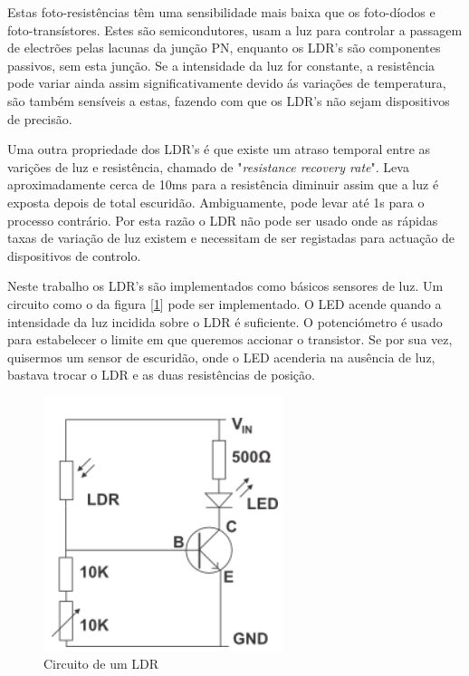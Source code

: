 \documentclass[12pt]{article}
\begin{document}
Estas foto-resistências têm uma sensibilidade mais baixa que os foto-díodos e foto-transístores. Estes são semicondutores, usam a luz para controlar a passagem de electrões pelas lacunas da junção PN, enquanto os LDR's são componentes passivos, sem esta junção. Se a intensidade da luz for constante, a resistência pode variar ainda assim significativamente devido ás variações de temperatura, são também sensíveis a estas, fazendo com que os LDR's não sejam dispositivos de precisão.\\
\par Uma outra propriedade dos LDR's é que existe um atraso temporal entre as varições de luz e resistência, chamado de "\textit{resistance recovery rate}". Leva aproximadamente cerca de 10ms para a resistência diminuir assim que a luz é exposta depois de total escuridão. Ambiguamente, pode levar até 1s para o processo contrário. Por esta razão o LDR não pode ser usado onde as rápidas taxas de variação de luz existem e necessitam de ser registadas para actuação de dispositivos de controlo.\\
\par Neste trabalho os LDR's são implementados como básicos sensores de luz. Um circuito como o da figura [\ref{fig:ldr_circ}] pode ser implementado. O LED acende quando a intensidade da luz incidida sobre o LDR é suficiente. O potenciómetro é usado para estabelecer o limite em que queremos accionar o transistor. Se por sua vez, quisermos um sensor de escuridão, onde o LED acenderia na ausência de luz, bastava trocar o LDR e as duas resistências de posição.



\begin{figure}[H]
        \centering
        \includegraphics[width=0.4\linewidth]{imgs/LDR_circuit.png}
        \caption{Circuito de um LDR}
        \label{fig:ldr_circ}
    \end{figure}

\end{document}
